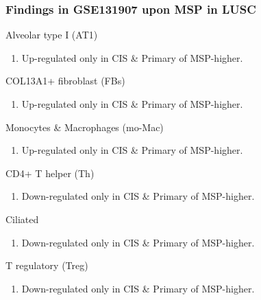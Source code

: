 \documentclass{beamer}
\begin{document}
    \begin{frame}[allowframebreaks]
        \frametitle{Findings in GSE131907 upon MSP in LUSC}

        \begin{block}{Alveolar type I (AT1)}
            \begin{enumerate}
                \item Up-regulated only in CIS \& Primary of MSP-higher.
            \end{enumerate}
        \end{block}

        \begin{block}{COL13A1+ fibroblast (FBs)}
            \begin{enumerate}
                \item Up-regulated only in CIS \& Primary of MSP-higher.
            \end{enumerate}
        \end{block}

        \begin{block}{Monocytes \& Macrophages (mo-Mac)}
            \begin{enumerate}
                \item Up-regulated only in CIS \& Primary of MSP-higher.
            \end{enumerate}
        \end{block}

        \begin{block}{CD4+ T helper (Th)}
            \begin{enumerate}
                \item Down-regulated only in CIS \& Primary of MSP-higher.
            \end{enumerate}
        \end{block}

        \begin{block}{Ciliated}
            \begin{enumerate}
                \item Down-regulated only in CIS \& Primary of MSP-higher.
            \end{enumerate}
        \end{block}

        \begin{block}{T regulatory (Treg)}
            \begin{enumerate}
                \item Down-regulated only in CIS \& Primary of MSP-higher.
            \end{enumerate}
        \end{block}


\end{frame}
\end{document}
